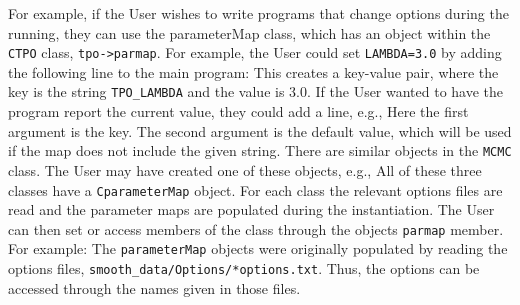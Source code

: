 \documentclass[UserManual.tex]{subfiles}
\begin{document}
\begin{sloppypar}
For example, if the User wishes to write programs that change options during the running, they can use the parameterMap class, which has an object within the {\tt CTPO} class, {\tt tpo->parmap}. For example, the User could set {\tt LAMBDA=3.0} by adding the following line to the main program:
\vspace*{-8pt}{\tt \begin{Verbatim}[commandchars=\\\{\}]
    .
   tpo->parmap.set("TPO_LAMBDA",3.0);
    .
\end{Verbatim}
}\vspace*{-8pt}
This creates a key-value pair, where the key is the string {\tt TPO\_LAMBDA} and the value is 3.0.
If the User wanted to have the program report the current value, they could add a line, e.g.,
\vspace*{-8pt}{\tt \begin{Verbatim}[commandchars=\\\{\}]
    .
   int NMC=tpo->parmap.getI("TPO_NMC",0);
    .
\end{Verbatim}
}\vspace*{-8pt}
Here the first argument is the key. The second argument is the default value, which will be used if the map does not include the given string.
There are similar objects in the {\tt MCMC} class. The User may have created one of these objects, e.g.,
\vspace*{-8pt}{\tt \begin{Verbatim}[commandchars=\\\{\}]
	NBandSmooth::CTPO *tpo=new CTPO();
	NBandSmooth::CSmoothMaster smoothmaster;
	NBandSmooth::CMCMC mcmc(&smoothmaster);
\end{Verbatim}
}\vspace*{-8pt}
All of these three classes have a {\tt CparameterMap} object. For each class the relevant options files are read and the parameter maps are populated during the instantiation. The User can then set or access members of the class through the objects {\tt parmap} member. For example:
\vspace*{-8pt}{\tt \begin{Verbatim}[commandchars=\\\{\}]
	double Lambda=smoothmaster.parmap->getD("SmoothEmulator_LAMBDA",2.5);
	double stepsize=mcmc.parmap.getD("MCMC_METROPOLIS_STEPSIZE",0.06);
\end{Verbatim}
}\vspace*{-8pt}
The {\tt parameterMap} objects were originally populated by reading the options files, {\tt smooth\_data/Options/*options.txt}. Thus, the options can be accessed through the names given in those files.


\end{sloppypar}
\end{document}
